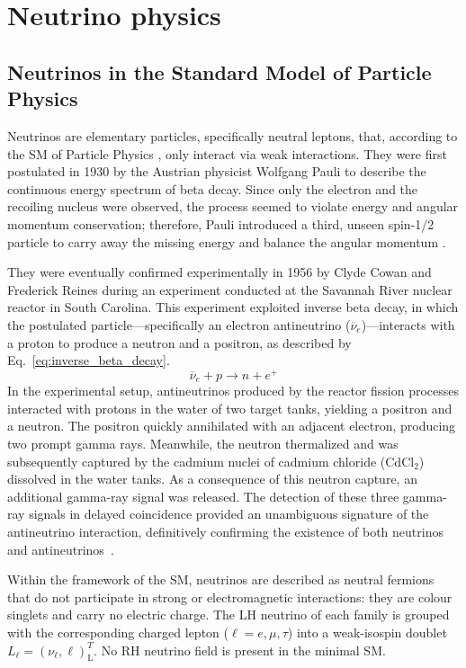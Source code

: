 \chapter{Neutrino physics}
\section{Neutrinos in the Standard Model of Particle Physics}
\label{sec:nuIntro}
Neutrinos are elementary particles, specifically neutral leptons, that, according to the \ac{SM} of Particle Physics \cite{fundamentalsOFnu}, only interact via weak interactions.  
They were first postulated in 1930 by the Austrian physicist Wolfgang Pauli to describe the continuous energy spectrum of beta decay. 
Since only the electron and the recoiling nucleus were observed, the process seemed to violate energy and angular momentum conservation; therefore, Pauli introduced a third, 
unseen spin-1/2 particle to carry away the missing energy and balance the angular momentum \cite{Pauli:1930neutrinos}.

They were eventually confirmed experimentally in 1956 by Clyde Cowan and Frederick Reines during an experiment conducted at the Savannah River 
nuclear reactor in South Carolina. 
This experiment exploited inverse beta decay, in which the postulated particle---specifically an electron antineutrino ($\overline{\nu}_e$)---interacts with a proton to produce a neutron and a positron, as described by Eq.~\ref{eq:inverse_beta_decay}.
\begin{equation}
    \label{eq:inverse_beta_decay}
    \overline{\nu}_e + p \rightarrow n + e^{+}
\end{equation}
In the experimental setup, antineutrinos produced by the reactor fission processes interacted with protons in the water of two target tanks, 
yielding a positron and a neutron. The positron quickly annihilated with an adjacent electron, producing two prompt gamma rays. 
Meanwhile, the neutron thermalized and was subsequently captured by the cadmium nuclei of cadmium chloride (CdCl$_2$) dissolved in the water tanks.
As a consequence of this neutron capture, an additional gamma-ray signal was released. The detection of these three gamma-ray signals 
in delayed coincidence provided an unambiguous signature of the antineutrino interaction, definitively confirming the existence of 
both neutrinos and antineutrinos~\cite{cowan1956nudetection}.

Within the framework of the \ac{SM}, neutrinos are described as neutral fermions that do not participate in strong or 
electromagnetic interactions: they are colour singlets and carry no electric charge. The \ac{LH} neutrino of each family is grouped with the corresponding charged lepton ($\ell = e, \mu, \tau$) into a weak-isospin doublet $L_\ell = (\nu_\ell, \ell)^T_\text{L}$.
No \ac{RH} neutrino field is present in the minimal \ac{SM}.

